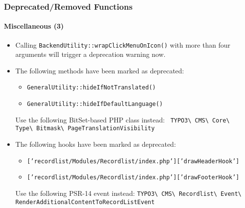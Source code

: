 %

\begin{frame}[fragile]
	\frametitle{Deprecated/Removed Functions}
	\framesubtitle{Miscellaneous (3)}

	\begin{itemize}
		\item Calling \texttt{BackendUtility::wrapClickMenuOnIcon()} with more
			than four arguments will trigger a deprecation warning now.
		\item The following methods have been marked as deprecated:
			\begin{itemize}\smaller
				\item \texttt{GeneralUtility::hideIfNotTranslated()}
				\item \texttt{GeneralUtility::hideIfDefaultLanguage()}
			\end{itemize}\normalsize
			\small
				Use the following BitSet-based PHP class instead:\newline
				\smaller\texttt{
					TYPO3\textbackslash
					CMS\textbackslash
					Core\textbackslash
					Type\textbackslash
					Bitmask\textbackslash
					PageTranslationVisibility}
			\normalsize

		\item The following hooks have been marked as deprecated:
			\begin{itemize}\smaller
				\item \texttt{['recordlist/Modules/Recordlist/index.php']['drawHeaderHook']}
				\item \texttt{['recordlist/Modules/Recordlist/index.php']['drawFooterHook']}
			\end{itemize}\normalsize
			\small
				Use the following PSR-14 event instead:\newline
				\smaller\texttt{TYPO3\textbackslash
					CMS\textbackslash
					Recordlist\textbackslash
					Event\textbackslash
					RenderAdditionalContentToRecordListEvent}
			\normalsize

	\end{itemize}

\end{frame}

